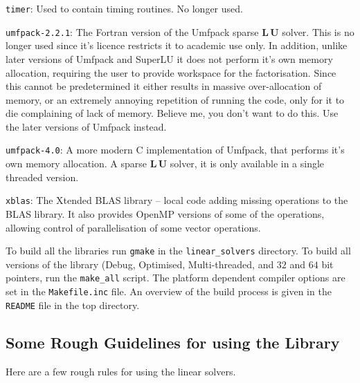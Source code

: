 {\tt timer}:
Used to contain timing routines. No longer used.

{\tt umfpack-2.2.1}:
The Fortran version of the Umfpack sparse $\mathbf{L \, U}$ solver. This is
no longer used since it's licence restricts it to academic use only. In 
addition, unlike later versions of Umfpack and SuperLU it does not perform
it's own memory allocation, requiring the user to provide workspace for the 
factorisation. Since this cannot be predetermined it either results in massive
over-allocation of memory, or an extremely annoying repetition of running the 
code, only for it to die complaining of lack of memory. Believe me, you don't 
want to do this. Use the later versions of Umfpack instead.

{\tt umfpack-4.0}:
A more modern C implementation of Umfpack, that performs it's own memory 
allocation. A sparse $\mathbf{L \, U}$ solver, it is only available in a 
single threaded version.

{\tt xblas}:
The Xtended BLAS library -- local code adding missing operations to the BLAS 
library. It also provides OpenMP versions of some of the operations, allowing
control of parallelisation of some vector operations.

To build all the libraries run {\tt gmake} in the {\tt linear\_solvers} 
directory. To build all versions of the library (Debug, Optimised, 
Multi-threaded, and $32$ and $64$ bit pointers, run the {\tt make\_all} script.
The platform dependent compiler options are set in the {\tt Makefile.inc} file.
An overview of the build process is given in the {\tt README} file in the top 
directory.


\subsection{Some Rough Guidelines for using the Library}\label{s5.2}

Here are a few rough rules for using the linear solvers.

